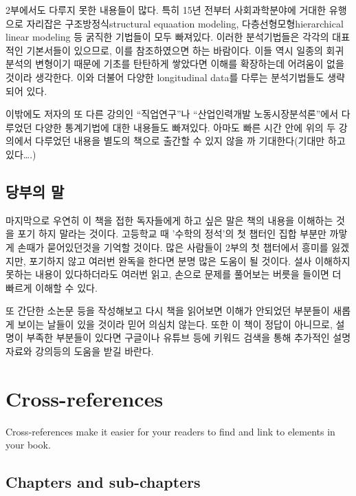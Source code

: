 \documentclass[
]{book}
\theoremstyle{definition}
\theoremstyle{definition}
\theoremstyle{definition}
\theoremstyle{definition}
\theoremstyle{remark}
\begin{document}
2부에서도 다루지 못한 내용들이 많다. 특히 15년 전부터 사회과학분야에 거대한 유행으로 자리잡은 구조방정식structural equaation modeling, 다층선형모형hierarchical linear modeling 등 굵직한 기법들이 모두 빠져있다. 이러한 분석기법들은 각각의 대표적인 기본서들이 있으므로, 이를 참조하였으면 하는 바람이다. 이들 역시 일종의 회귀분석의 변형이기 때문에 기초를 탄탄하게 쌓았다면 이해를 확장하는데 어려움이 없을 것이라 생각한다. 이와 더불어 다양한 longitudinal data를 다루는 분석기법들도 생략되어 있다.

이밖에도 저자의 또 다른 강의인 ``직업연구''나 ``산업인력개발 노동시장분석론''에서 다루었던 다양한 통계기법에 대한 내용들도 빠져있다. 아마도 빠른 시간 안에 위의 두 강의에서 다루었던 내용을 별도의 책으로 출간할 수 있지 않을 까 기대한다(기대만 하고 있다\ldots.)

\hypertarget{uxb2f9uxbd80uxc758-uxb9d0}{%
\section{당부의 말}\label{uxb2f9uxbd80uxc758-uxb9d0}}

마지막으로 우연히 이 책을 접한 독자들에게 하고 싶은 말은 책의 내용을 이해하는 것을 포기 하지 말라는 것이다. 고등학교 때 '수학의 정석'의 첫 챕터인 집합 부분만 까맣게 손때가 묻어있던것을 기억할 것이다. 많은 사람들이 2부의 첫 챕터에서 흥미를 잃겠지만, 포기하지 않고 여러번 완독을 한다면 분명 많은 도움이 될 것이다. 설사 이해하지 못하는 내용이 있다하더라도 여러번 읽고, 손으로 문제를 풀어보는 버릇을 들이면 더 빠르게 이해할 수 있다.

또 간단한 소논문 등을 작성해보고 다시 책을 읽어보면 이해가 안되었던 부분들이 새롭게 보이는 날들이 있을 것이라 믿어 의심치 않는다. 또한 이 책이 정답이 아니므로, 설명이 부족한 부분들이 있다면 구글이나 유튜브 등에 키워드 검색을 통해 추가적인 설명자료와 강의등의 도움을 받길 바란다.

\hypertarget{cross}{%
\chapter{Cross-references}\label{cross}}

Cross-references make it easier for your readers to find and link to elements in your book.

\hypertarget{chapters-and-sub-chapters}{%
\section{Chapters and sub-chapters}\label{chapters-and-sub-chapters}}
\end{document}
